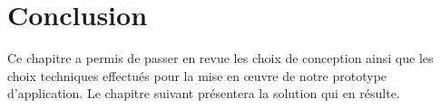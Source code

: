 \section*{Conclusion}
Ce chapitre a permis de passer en revue les choix de conception ainsi que les choix techniques effectués
pour la mise en œuvre de notre prototype d’application. 
Le chapitre suivant présentera la solution qui en résulte.